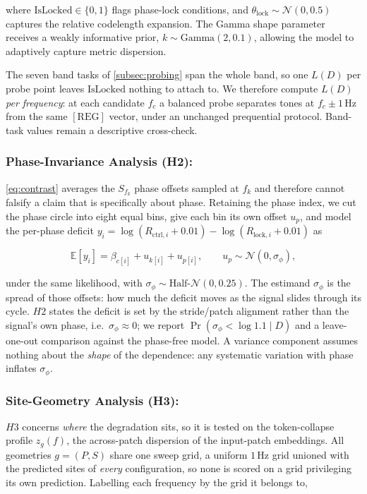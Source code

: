 where $\text{IsLocked} \in \{0, 1\}$ flags phase-lock conditions, and $\theta_{\text{lock}} \sim \mathcal{N}(0, 0.5)$ captures the relative codelength expansion. The Gamma shape parameter receives a weakly informative prior, $k \sim \text{Gamma}(2, 0.1)$, allowing the model to adaptively capture metric dispersion.

The seven band tasks of \autoref{subsec:probing} span the whole band, so one $L(D)$ per probe point leaves $\text{IsLocked}$ nothing to attach to. We therefore compute $L(D)$ \emph{per frequency}: at each candidate $f_c$ a balanced probe separates tones at $f_c \pm 1\,\mathrm{Hz}$ from the same $[\mathrm{REG}]$ vector, under an unchanged prequential protocol. Band-task values remain a descriptive cross-check.

\subsubsection{Phase-Invariance Analysis (H2):} \autoref{eq:contrast} averages the $S_{f_k}$ phase offsets sampled at $f_k$ and therefore cannot falsify a claim that is specifically about phase. Retaining the phase index, we cut the phase circle into eight equal bins, give each bin its own offset $u_{p}$, and model the per-phase deficit $y_i = \log(R_{\text{ctrl},i}+0.01) - \log(R_{\text{lock},i}+0.01)$ as

\begin{equation}
\label{eq:h2_phase}
\mathbb{E}[y_i]
=
\beta_{c[i]}
+
u_{k[i]}
+
u_{p[i]},
\qquad
u_p \sim \mathcal{N}(0, \sigma_\phi),
\end{equation}

under the same likelihood, with $\sigma_\phi \sim \text{Half-}\mathcal{N}(0,0.25)$. The estimand $\sigma_\phi$ is the spread of those offsets: how much the deficit moves as the signal slides through its cycle. $H2$ states the deficit is set by the stride/patch alignment rather than the signal's own phase, i.e.\ $\sigma_\phi \approx 0$; we report $\Pr(\sigma_\phi < \log 1.1 \mid D)$ and a leave-one-out comparison against the phase-free model. A variance component assumes nothing about the \emph{shape} of the dependence: any systematic variation with phase inflates $\sigma_\phi$.

\subsubsection{Site-Geometry Analysis (H3):} $H3$ concerns \emph{where} the degradation sits, so it is tested on the token-collapse profile $z_g(f)$, the across-patch dispersion of the input-patch embeddings. All geometries $g=(P,S)$ share one sweep grid, a uniform $1\,\mathrm{Hz}$ grid unioned with the predicted sites of \emph{every} configuration, so none is scored on a grid privileging its own prediction. Labelling each frequency by the grid it belongs to,

